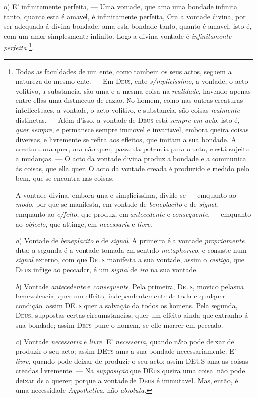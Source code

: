 o) E' infinitamente perfeita, --- Uma vontade, que ama uma bondade infinita tanto, quanto esta é amavel, é infinitamente perfeita, Ora a vontade divina, por ser adequada á divina bondade, ama esta bondade tanto, quanto é amavel, isto é, com um amor simplesmente infinito. Logo a divina vontade é \emph{infinitamente perfeita} \footnote{Todas as faculdades de um ente, como tambem os seus actos, seguem a natureza do mesmo ente. --- Em \textsc{Deus}, ente \emph{s/mplicissimo}, a vontade, o acto volitivo, a substancia, são uma e a mesma coisa na \emph{realidade}, havendo apenas entre ellas uma distinecüo de razão. No homem, como nas outras creaturas intellectuaes, a vontade, o acto volitivo, e substancia, são coisas \emph{realmente} distinctas. --- Além d'isso, a vontade de \textsc{Deus} está \emph{sempre em acto}, isto é, \emph{quer sempre}, e permanece sempre immovel e invariavel, embora queira coisas diversas, e livremente se refira aos effeitos, que imitam a sua bondade. A creatura ora quer, ora não quer, passa da potencia para o acto, e está sujeita a mudanças. --- O acto da vontade divina produz a bondade e a communica ás coisas, que ella quer. O acto da vontade creada é produzido e medido pelo bem, que se encontra nas coisas.\par *\par A vontade divina, embora una e simplicissima, divide-se --- emquanto ao \emph{modo}, por que se manifesta, em vontade de \emph{beneplacito} e de \emph{signal}, --- emquanto ao \emph{e/feito}, que produz, em \emph{antecedente} e \emph{consequente}, --- emquanto ao \emph{objecto}, que attinge, em \emph{necessaria} e \emph{livre}.\par \emph{a}) Vontade de \emph{beneplacito} e de \emph{signal}. A primeira é a vontade \emph{propriamente} dita; a segunda é a vontade tomada em sentido \emph{metaphorico}, e consiste num \emph{signal} externo, com que \textsc{Deus} manifesta a sua vontade, assim o \emph{castigo}, que \textsc{Deus} inflige ao peccador, é um \emph{signal} de \emph{ira} na sua vontade.\par \emph{b}) Vontade \emph{antecedente} e \emph{consequente}. Pela primeira, \textsc{Deus}, movido pelasua benevolencia, quer um effeito, independentemente de toda e qualquer condição; assim \textsc{DEus} quer a salvação da todos os homens. Pela segunda, \textsc{Deus}, suppostas certas cireumstancias, quer um effeito ainda que extranho á sua bondade; assim \textsc{Deus} pune o homem, se elle morrer em peceado.\par \emph{c}) Vontade \emph{necessaria} e \emph{livre}. E' \emph{necessaria}, quando n\&o pode deixar de produzir o seu acto; assim \textsc{DEus} ama a sua bondade necessariamente. E' \emph{livre}, quando pode deixar de produzir o seu acto; assim \textsc{DEUS} ama as coisas creadas livremente. --- Na \emph{supposição} que \textsc{DEus} queira uma coisa, não pode deixar de a querer; porque a vontade de \textsc{Deus} é immutavel. Mas, então, é uma necessidade \emph{Aypothetica}, não \emph{absoluta}.}.

